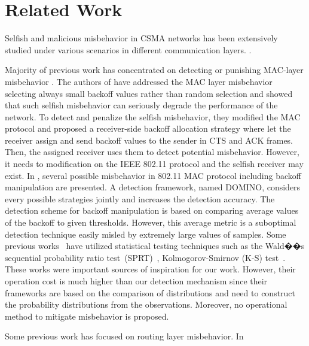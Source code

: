 \section{Related Work}

Selfish and malicious misbehavior in CSMA networks
has been extensively studied 
under various scenarios in different communication layers.
\cite{Kysanur:Vaidya05, Radosavac-Wise05, Raya-DOMINO, Toledo:Wang07a}.

Majority of previous work has concentrated on detecting or punishing
MAC-layer misbehavior \cite{Kysanur:Vaidya05, Raya-DOMINO, Radosavac-Wise05, Rong-Infocom06, Toledo:Wang07a}.
%
The authors of \cite{Kysanur:Vaidya05} have addressed the MAC layer misbehavior
selecting always small backoff values rather than random selection
and showed that such selfish misbehavior
can seriously degrade the performance of the network. To detect and penalize
the selfish misbehavior, they modified the MAC protocol and proposed a
receiver-side backoff allocation strategy where let
the receiver assign and send backoff values to the sender in
CTS and ACK frames.
Then, the assigned receiver uses them to detect potential misbehavior.
However, it needs to modification on the IEEE
802.11 protocol and the selfish receiver may exist.
%
In \cite{Radosavac-Wise05},
several possible misbehavior in 802.11 MAC protocol including
backoff manipulation are presented.
A detection framework, named DOMINO, considers
every possible strategies jointly and increases the detection accuracy.
The detection scheme for backoff manipulation is based on comparing
average values of the backoff to given thresholds.
However, this average metric is a suboptimal detection technique easily
misled by extremely large values of samples.
Some previous works~\cite{Toledo:Wang07a, Radosavac-Wise05} have utilized
statistical testing techniques such as
the Wald��s sequential probability ratio test~(SPRT)~\cite{Radosavac-Wise05},
Kolmogorov-Smirnov (K-S) test~\cite{Toledo:Wang07a}.
These works were important sources of inspiration for our work.
However, their operation cost is much higher
than our detection mechanism since their frameworks are
based on the comparison of distributions and
need to construct the probability distributions from
the observations. Moreover, no operational method to mitigate misbehavior
is proposed.


Some previous work has focused on routing layer misbehavior\cite{BenSalem03, Marti03}.
In 

